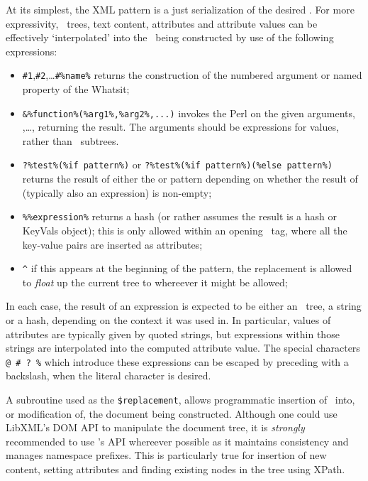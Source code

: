 \documentclass{book}
\newcommand{\ltxcode}{\lstinline[style=inlinelatexml]}
\begin{document}
At its simplest, the XML pattern is a just serialization of the desired \XML.
For more expressivity, \XML\ trees, text content, attributes and attribute values can
be effectively `interpolated' into the \XML\ being constructed by use of the following expressions:
\begin{itemize}
\item \ltxcode|#1|,\ltxcode|#2|,\ldots \ltxcode|#%
   returns the construction of the numbered argument
   or named property of the Whatsit;
\item \ltxcode|&%
   invokes the Perl  on the given arguments,
   ,\ldots, returning the result.
   The arguments should be expressions for values, rather than \XML\ subtrees.
\item \ltxcode|?%
   or \ltxcode|?%
   returns the result of either the  or  pattern
   depending on whether the result of  (typically also an expression) is non-empty;
\item \verb|%|\ltxcode{%
   returns a hash (or rather assumes the result is a hash or KeyVals object);
   this is only allowed within an opening \XML\ tag, where all the key-value pairs are
   inserted as attributes;
\item \ltxcode|^|
   if this appears at the beginning of the pattern,
   the replacement is allowed to \emph{float} up the current tree to whereever it might be allowed;
\end{itemize}
In each case, the result of an expression is expected to be either an \XML\ tree,
a string or a hash, depending on the context it was used in.  In particular,
values of attributes are typically given by quoted strings, but expressions within those
strings are interpolated into the computed attribute value.
The special characters \verb|@ # ? %| which introduce these expressions can
be escaped by preceding with a backslash, when the literal character is desired.

A subroutine used as the \ltxcode|$replacement|, %
allows programmatic insertion of \XML\ into, or modification of, the document being constructed.
Although one could use LibXML's DOM API to manipulate the document tree,
it is \emph{strongly} recommended to use 's API whereever possible
as it maintains consistency and manages namespace prefixes.
This is particularly true for insertion of new content, setting attributes and
finding existing nodes in the tree using XPath. 
\end{document}

